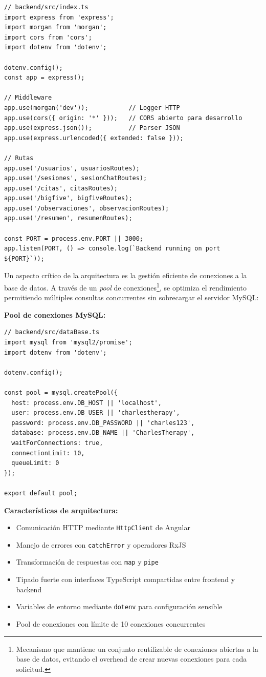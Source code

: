 \documentclass[12pt,a4paper]{report}
\numberwithin{figure}{section}
\begin{document}
\begin{lstlisting}[style=angelcode,caption={Configuración de middleware en index.ts}]
// backend/src/index.ts
import express from 'express';
import morgan from 'morgan';
import cors from 'cors';
import dotenv from 'dotenv';

dotenv.config();
const app = express();

// Middleware
app.use(morgan('dev'));           // Logger HTTP
app.use(cors({ origin: '*' }));   // CORS abierto para desarrollo
app.use(express.json());          // Parser JSON
app.use(express.urlencoded({ extended: false }));

// Rutas
app.use('/usuarios', usuariosRoutes);
app.use('/sesiones', sesionChatRoutes);
app.use('/citas', citasRoutes);
app.use('/bigfive', bigfiveRoutes);
app.use('/observaciones', observacionRoutes);
app.use('/resumen', resumenRoutes);

const PORT = process.env.PORT || 3000;
app.listen(PORT, () => console.log(`Backend running on port ${PORT}`));
\end{lstlisting}

Un aspecto crítico de la arquitectura es la gestión eficiente de conexiones a la base de datos. A través de un \textit{pool} de conexiones\footnote{Mecanismo que mantiene un conjunto reutilizable de conexiones abiertas a la base de datos, evitando el overhead de crear nuevas conexiones para cada solicitud.}, se optimiza el rendimiento permitiendo múltiples consultas concurrentes sin sobrecargar el servidor MySQL:

\textbf{Pool de conexiones MySQL:}

\begin{lstlisting}[style=angelcode,caption={Configuración de pool en dataBase.ts}]
// backend/src/dataBase.ts
import mysql from 'mysql2/promise';
import dotenv from 'dotenv';

dotenv.config();

const pool = mysql.createPool({
  host: process.env.DB_HOST || 'localhost',
  user: process.env.DB_USER || 'charlestherapy',
  password: process.env.DB_PASSWORD || 'charles123',
  database: process.env.DB_NAME || 'CharlesTherapy',
  waitForConnections: true,
  connectionLimit: 10,
  queueLimit: 0
});

export default pool;
\end{lstlisting}

\textbf{Características de arquitectura:}
\begin{itemize}
  \item Comunicación HTTP mediante \texttt{HttpClient} de Angular
  \item Manejo de errores con \texttt{catchError} y operadores RxJS
  \item Transformación de respuestas con \texttt{map} y \texttt{pipe}
  \item Tipado fuerte con interfaces TypeScript compartidas entre frontend y backend
  \item Variables de entorno mediante \texttt{dotenv} para configuración sensible
  \item Pool de conexiones con límite de 10 conexiones concurrentes
\end{itemize}
\end{document}
